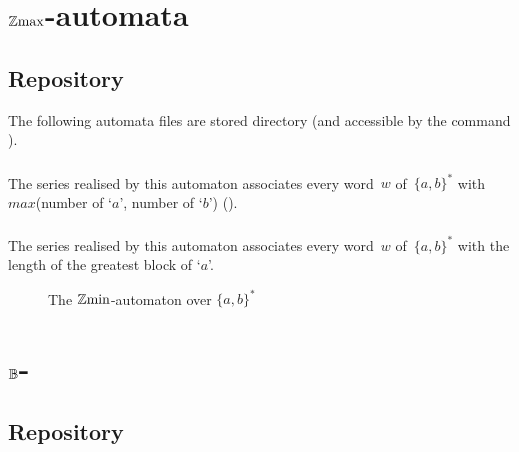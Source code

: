 \section{$\mathbb{Z}\mathrm{max}$-automata}
\subsection{Repository}

The following automata files are stored
 directory (and accessible by the command
).

\subsubsection{}
\Comt
The series realised by this automaton associates every word~$w$
of~$\{a,b\}^{*}$ with $max$(number of `$a$', number of `$b$') (\cf {}).


\subsubsection{}

\Comt
The series realised by this automaton associates every word~$w$
of~$\{a,b\}^{*}$ with the length of the greatest block of `$a$'.

\begin{figure}[ht]
\centering
{}%
\caption{The $\mathbb{Z}\mathrm{min}$-automaton  over $\{a,b\}^*$}
\label{fig:maxblocka-app}
\end{figure}

\section{$\mathbb{B}$-\fmpts}

\subsection{Repository}

